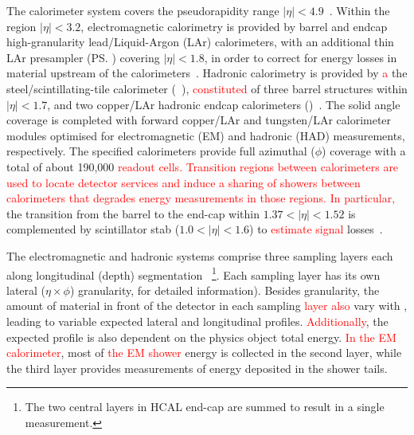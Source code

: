 The calorimeter system covers the pseudorapidity
range \(|\eta| < 4.9\)~\cite{PERF-2007-01}. Within the region \(|\eta|< 3.2\),
electromagnetic calorimetry is provided by barrel and endcap high-granularity
lead/Liquid-Argon (LAr) calorimeters, with an additional thin LAr presampler
(\ps) covering \(|\eta| < 1.8\), in order to correct for energy losses in
material upstream of the calorimeters~\cite{LARG-2009-01,larg_tdr}. Hadronic
calorimetry is provided by \textcolor{red}{a} the steel/scintillating-tile calorimeter
(\tilecal~\cite{TCAL-2017-01,tile_tdr}), \textcolor{red}{constituted} of three barrel structures
within \(|\eta| < 1.7\), and two copper/LAr hadronic endcap calorimeters
(\hec)~\cite{cal_tdr}.  The solid angle coverage is completed with forward
copper/LAr and tungsten/LAr calorimeter modules optimised for electromagnetic
(EM) and hadronic (HAD) measurements, respectively. The specified calorimeters
provide full azimuthal ($\phi$) coverage with a total of about 190,000 \textcolor{red}{readout cells. Transition regions between calorimeters are used to locate detector services and induce a sharing of showers between calorimeters that degrades energy measurements in those regions. In particular,} the transition from the barrel to the end-cap within
$1.37<|\eta|<1.52$ is complemented by scintillator stab ($1.0<|\eta|<1.6$) to
\textcolor{red}{estimate signal} losses~\cite{cal_tdr}.

The electromagnetic and hadronic systems comprise three sampling layers each along longitudinal (depth) segmentation ~\cite{PERF-2007-01}\footnote{The two
central layers in HCAL end-cap are summed to result in a single measurement.}.
Each sampling layer has its own lateral ($\eta\times\phi$) granularity, for detailed information). Besides granularity, the amount of material in front of the detector in each sampling \textcolor{red}{layer also} vary with \abseta, leading to variable expected lateral and longitudinal profiles. \textcolor{red}{Additionally}, the expected
profile is also dependent on the physics object total energy. \textcolor{red}{In the EM calorimeter}, most of \textcolor{red}{the EM shower} energy is collected in the second layer, while the third layer provides measurements
of energy deposited in the shower tails. %


